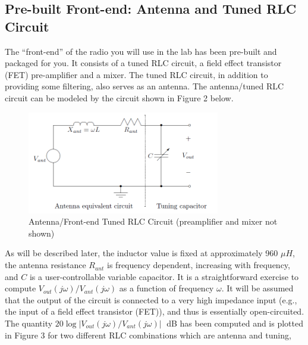 \documentclass [utf8] {article}
\begin{document}
\subsection{Pre-built Front-end: Antenna and Tuned RLC Circuit}
{
	The “front-end” of the radio you will use in the lab has been pre-built and packaged for you. It consists of a tuned RLC circuit, a field effect transistor (FET) pre-amplifier and a mixer. The tuned RLC circuit, in addition to providing some filtering, also serves as an antenna. The antenna/tuned RLC circuit can be modeled by the circuit shown in Figure 2 below.

	\begin{figure}[H]
		\begin{small}
			\begin{center}
				\includegraphics[width=0.75\textwidth]{figures/Figure2.png}
			\end{center}
			\caption{Antenna/Front-end Tuned RLC Circuit (preamplifier and mixer not shown)}
			\label{fig:prebuilt}
		\end{small}
	\end{figure}

	As will be described later, the inductor value is fixed at approximately 960 $\mu H$, the antenna resistance $R_{ant}$ is frequency dependent, increasing with frequency, and $C$ is a user-controllable variable capacitor. It is a straightforward exercise to compute $V_{out}(j\omega)/V_{ant}(j\omega)$ as a function of frequency $\omega$. It will be assumed that the output of the circuit is connected to a very high impedance input (e.g., the input of a field effect transistor (FET)), and thus is essentially open-circuited. The quantity $20\log|V_{out}(j\omega)/V_{ant}(j\omega)|$  dB has been computed and is plotted in Figure 3 for two different RLC combinations which are antenna and tuning,

}
\end{document}
